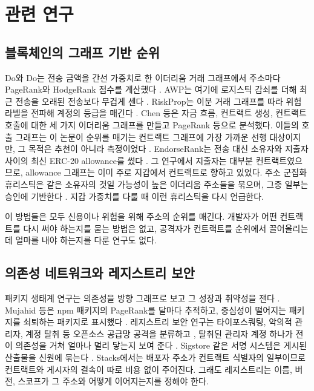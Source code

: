 \section{관련 연구}
\label{sec:related}

\subsection{블록체인의 그래프 기반 순위}

Do와 Do는 전송 금액을 간선 가중치로 한 이더리움 거래 그래프에서 주소마다 PageRank와 HodgeRank 점수를 계산했다 \cite{do2023hodgerank}. AWP는 여기에 로지스틱 감쇠를 더해 최근 전송을 오래된 전송보다 무겁게 센다 \cite{do2023awp}. RiskProp는 이분 거래 그래프를 따라 위험 라벨을 전파해 계정의 등급을 매긴다 \cite{lin2025riskprop}. Chen 등은 자금 흐름, 컨트랙트 생성, 컨트랙트 호출에 대한 세 가지 이더리움 그래프를 만들고 PageRank 등으로 분석했다. 이들의 호출 그래프는 이 논문이 순위를 매기는 컨트랙트 그래프에 가장 가까운 선행 대상이지만, 그 목적은 추천이 아니라 측정이었다 \cite{chen2018ethereum}. EndorseRank는 전송 대신 소유자와 지출자 사이의 최신 ERC-20 allowance를 썼다 \cite{kwon2026endorserank}. 그 연구에서 지출자는 대부분 컨트랙트였으므로, allowance 그래프는 이미 주로 지갑에서 컨트랙트로 향하고 있었다. 주소 군집화 휴리스틱은 같은 소유자의 것일 가능성이 높은 이더리움 주소들을 묶으며, 그중 일부는 승인에 기반한다 \cite{victor2020clustering}. 지갑 가중치를 다룰 때 이런 휴리스틱을 다시 언급한다.

이 방법들은 모두 신용이나 위험을 위해 주소의 순위를 매긴다. 개발자가 어떤 컨트랙트를 다시 써야 하는지를 묻는 방법은 없고, 공격자가 컨트랙트를 순위에서 끌어올리는 데 얼마를 내야 하는지를 다룬 연구도 없다.

\subsection{의존성 네트워크와 레지스트리 보안}

패키지 생태계 연구는 의존성을 방향 그래프로 보고 그 성장과 취약성을 잰다 \cite{kikas2017structure,decan2019empirical}. Mujahid 등은 npm 패키지의 PageRank를 달마다 추적하고, 중심성이 떨어지는 패키지를 쇠퇴하는 패키지로 표시했다 \cite{mujahid2021centrality}. 레지스트리 보안 연구는 타이포스쿼팅, 악의적 관리자, 계정 탈취 등 오픈소스 공급망 공격을 분류하고 \cite{ohm2020backstabber,ladisa2023sok,vu2020typosquatting}, 탈취된 관리자 계정 하나가 전이 의존성을 거쳐 얼마나 멀리 닿는지 보여 준다 \cite{zimmermann2019small}. Sigstore 같은 서명 시스템은 게시된 산출물을 신원에 묶는다 \cite{newman2022sigstore}. Stacks에서는 배포자 주소가 컨트랙트 식별자의 일부이므로 컨트랙트와 게시자의 결속이 따로 비용 없이 주어진다. 그래도 레지스트리는 이름, 버전, 스코프가 그 주소와 어떻게 이어지는지를 정해야 한다.

